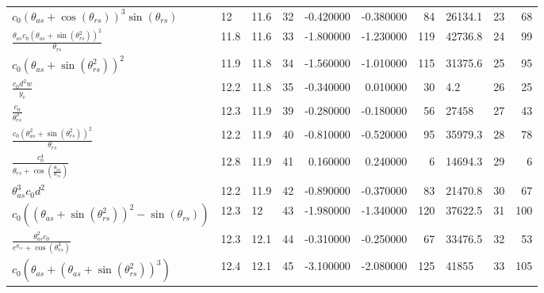\begin{tabularx}{\textwidth}{lllrrrrlrr}
$ c_{0} \left(\theta_{as} + \cos{\left(\theta_{rs} \right)}\right)^{3} \sin{\left(\theta_{rs} \right)} $  &  12\phantom{.0}  &  11.6  &  32  &  -0.420000  &  -0.380000  &  84  &  26134.1  &  23\phantom{.000000}  &  68\phantom{.000000}  \\ 
$ \displaystyle\frac{\theta_{as} c_{0} \left(\theta_{as} + \sin{\left(\theta_{rs}^{2} \right)}\right)^{2}}{\theta_{rs}} $  &  11.8  &  11.6  &  33  &  -1.800000  &  -1.230000  &  119  &  42736.8  &  24\phantom{.000000}  &  99\phantom{.000000}  \\ 
$ c_{0} \left(\theta_{as} + \sin{\left(\theta_{rs}^{2} \right)}\right)^{2} $  &  11.9  &  11.8  &  34  &  -1.560000  &  -1.010000  &  115  &  31375.6  &  25\phantom{.000000}  &  95\phantom{.000000}  \\ 
$ \displaystyle\frac{c_{0} d^{2} w}{y_c} $  &  12.2  &  11.8  &  35  &  -0.340000  &  0.010000  &  30  &  4.2  &  26\phantom{.000000}  &  25\phantom{.000000}  \\ 
$ \displaystyle\frac{c_{0}}{\theta_{rs}^{3}} $  &  12.3  &  11.9  &  39  &  -0.280000  &  -0.180000  &  56  &  27458\phantom{.0}  &  27\phantom{.000000}  &  43\phantom{.000000}  \\ 
$ \displaystyle\frac{c_{0} \left(\theta_{as}^{2} + \sin{\left(\theta_{rs}^{2} \right)}\right)^{2}}{\theta_{rs}} $  &  12.2  &  11.9  &  40  &  -0.810000  &  -0.520000  &  95  &  35979.3  &  28\phantom{.000000}  &  78\phantom{.000000}  \\ 
$ \displaystyle\frac{c_{0}^{4}}{\theta_{rs} + \cos{\left(\displaystyle\frac{\theta_{as}}{\theta_{rs}} \right)}} $  &  12.8  &  11.9  &  41  &  0.160000  &  0.240000  &  6  &  14694.3  &  29\phantom{.000000}  &  6\phantom{.000000}  \\ 
$ \theta_{as}^{3} c_{0} d^{2} $  &  12.2  &  11.9  &  42  &  -0.890000  &  -0.370000  &  83  &  21470.8  &  30\phantom{.000000}  &  67\phantom{.000000}  \\ 
$ c_{0} \left(\left(\theta_{as} + \sin{\left(\theta_{rs}^{2} \right)}\right)^{2} - \sin{\left(\theta_{rs} \right)}\right) $  &  12.3  &  12\phantom{.0}  &  43  &  -1.980000  &  -1.340000  &  120  &  37622.5  &  31\phantom{.000000}  &  100\phantom{.000000}  \\ 
$ \displaystyle\frac{\theta_{as}^{2} c_{0}}{e^{\theta_{rs}} + \cos{\left(\theta_{rs}^{3} \right)}} $  &  12.3  &  12.1  &  44  &  -0.310000  &  -0.250000  &  67  &  33476.5  &  32\phantom{.000000}  &  53\phantom{.000000}  \\ 
$ c_{0} \left(\theta_{as} + \left(\theta_{as} + \sin{\left(\theta_{rs}^{2} \right)}\right)^{3}\right) $  &  12.4  &  12.1  &  45  &  -3.100000  &  -2.080000  &  125  &  41855\phantom{.0}  &  33\phantom{.000000}  &  105\phantom{.000000}  \\ 

\end{tabularx}
